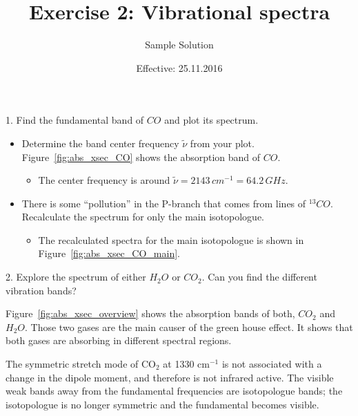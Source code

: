\documentclass[paper=a4, fontsize=11pt]{scrartcl} %
\title{Exercise 2: Vibrational spectra}
\author{Sample Solution}
\date{Effective: 25.11.2016}
\begin{document}
\maketitle

1. Find the fundamental band of $CO$ and plot its spectrum.
\begin{itemize}
  \item Determine the band center frequency $\tilde{\nu}$ from your plot.
    Figure~\ref{fig:abs_xsec_CO} shows the absorption band of $CO$.
    \begin{itemize}
      \item The center frequency is around $\tilde{\nu} = 2143\,cm^{-1} = 64.2\,GHz$.
    \end{itemize}

  \item There is some “pollution” in the P-branch that comes from lines of $^{13}CO$.
    Recalculate the spectrum for only the main isotopologue.
    \begin{itemize}
      \item The recalculated spectra for the main isotopologue is shown in
        Figure~\ref{fig:abs_xsec_CO_main}.
    \end{itemize}
\end{itemize}

2. Explore the spectrum of either $H_2O$ or $CO_2$. Can you find the different
vibration bands?

Figure~\ref{fig:abs_xsec_overview} shows the absorption bands of both, $CO_2$
and $H_2O$. Those two gases are the main causer of the green house effect. It
shows that both gases are absorbing in different spectral regions.

The symmetric stretch mode of CO$_2$ at 1330 cm$^{-1}$ is not associated with a
change in the dipole moment, and therefore is not infrared active. The visible
weak bands away from the fundamental frequencies are isotopologue bands; the
isotopologue is no longer symmetric and the fundamental becomes visible.
\end{document}
